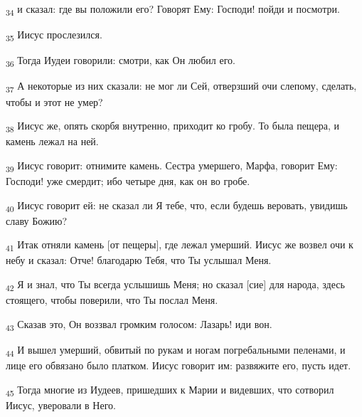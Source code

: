 \begin{tcolorbox}
\textsubscript{34} и сказал: где вы положили его? Говорят Ему: Господи! пойди и посмотри.
\end{tcolorbox}
\begin{tcolorbox}
\textsubscript{35} Иисус прослезился.
\end{tcolorbox}
\begin{tcolorbox}
\textsubscript{36} Тогда Иудеи говорили: смотри, как Он любил его.
\end{tcolorbox}
\begin{tcolorbox}
\textsubscript{37} А некоторые из них сказали: не мог ли Сей, отверзший очи слепому, сделать, чтобы и этот не умер?
\end{tcolorbox}
\begin{tcolorbox}
\textsubscript{38} Иисус же, опять скорбя внутренно, приходит ко гробу. То была пещера, и камень лежал на ней.
\end{tcolorbox}
\begin{tcolorbox}
\textsubscript{39} Иисус говорит: отнимите камень. Сестра умершего, Марфа, говорит Ему: Господи! уже смердит; ибо четыре дня, как он во гробе.
\end{tcolorbox}
\begin{tcolorbox}
\textsubscript{40} Иисус говорит ей: не сказал ли Я тебе, что, если будешь веровать, увидишь славу Божию?
\end{tcolorbox}
\begin{tcolorbox}
\textsubscript{41} Итак отняли камень [от пещеры], где лежал умерший. Иисус же возвел очи к небу и сказал: Отче! благодарю Тебя, что Ты услышал Меня.
\end{tcolorbox}
\begin{tcolorbox}
\textsubscript{42} Я и знал, что Ты всегда услышишь Меня; но сказал [сие] для народа, здесь стоящего, чтобы поверили, что Ты послал Меня.
\end{tcolorbox}
\begin{tcolorbox}
\textsubscript{43} Сказав это, Он воззвал громким голосом: Лазарь! иди вон.
\end{tcolorbox}
\begin{tcolorbox}
\textsubscript{44} И вышел умерший, обвитый по рукам и ногам погребальными пеленами, и лице его обвязано было платком. Иисус говорит им: развяжите его, пусть идет.
\end{tcolorbox}
\begin{tcolorbox}
\textsubscript{45} Тогда многие из Иудеев, пришедших к Марии и видевших, что сотворил Иисус, уверовали в Него.
\end{tcolorbox}
